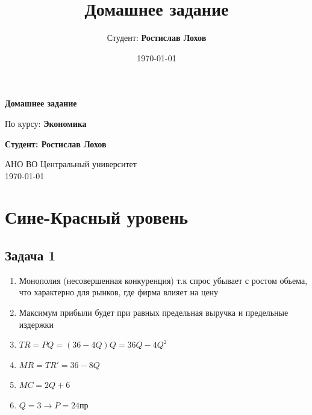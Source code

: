 \documentclass[a4paper,12pt]{article}
\title{Домашнее задание}
\author{Студент: \textbf{Ростислав Лохов}}
\date{\today}
\begin{document}
\begin{titlepage}
    \centering
    \vspace*{1cm}

    \Huge
    \textbf{Домашнее задание}

    \vspace{0.5cm}
    \LARGE
    По курсу: \textbf{Экономика}

    \vspace{1.5cm}

    \textbf{Студент: Ростислав Лохов}

    \vfill

    \Large
    АНО ВО Центральный университет\\
    \vspace{0.3cm}
    \today

\end{titlepage}

\tableofcontents
\newpage

\section{Сине-Красный уровень}


\subsection{Задача 1}
\begin{enumerate}
    \item Монополия (несовершенная конкуренция) т.к спрос убывает с ростом обьема, что характерно для рынков, где фирма влияет на цену
    \item Максимум прибыли будет при равных предельная выручка и предельные издержки
    \item $TR = PQ = (36-4Q)Q = 36Q-4Q^2$
    \item $MR = TR' = 36-8Q$
    \item $MC = 2Q+6$
    \item $Q = 3 \rightarrow P = 24$пр
\end{enumerate}
\end{document}
